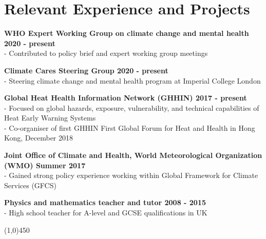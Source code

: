 \section*{Relevant Experience and Projects}

\noindent \textbf{WHO Expert Working Group on climate change and mental health \hfill 2020 - present}\\
- Contributed to policy brief and expert working group meetings\medskip

\noindent \textbf{Climate Cares Steering Group \hfill 2020 - present}\\
- Steering climate change and mental health program at Imperial College London \medskip

\noindent \textbf{Global Heat Health Information Network (GHHIN) \hfill 2017 - present}\\
- Focused on global hazards, exposure, vulnerability, and technical capabilities of Heat Early Warning Systems\\
- Co-organiser of first GHHIN First Global Forum for Heat and Health in Hong Kong, December 2018\medskip

\noindent \textbf{Joint Office of Climate and Health, World Meteorological Organization (WMO) \hfill Summer 2017}\\
\noindent - Gained strong policy experience working within Global Framework for Climate Services (GFCS)\medskip

\noindent \textbf{Physics and mathematics teacher and tutor \hfill 2008 - 2015}\\
- High school teacher for A-level and GCSE qualifications in UK

\begin{center} \line(1,0){450} \end{center}